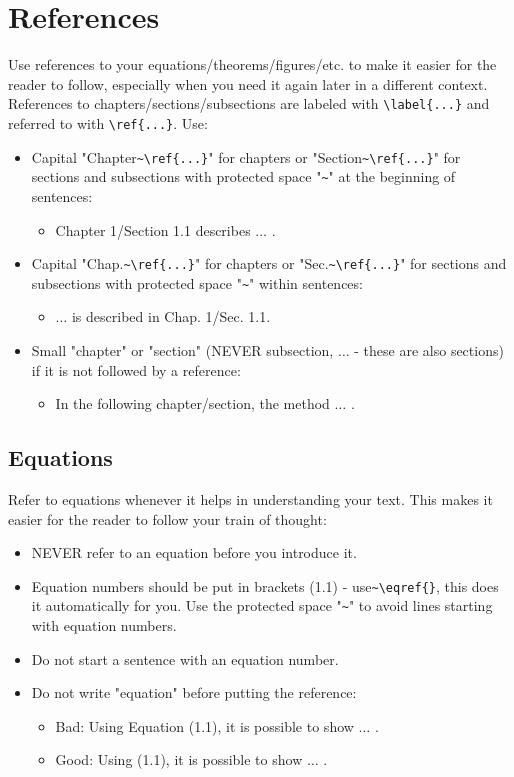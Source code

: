 \section{References}

Use references to your equations/theorems/figures/etc. to make it easier for the reader to follow, especially when you need it again later in a different context.
References to chapters/sections/subsections are labeled with \verb|\label{...}| and referred to with \verb|\ref{...}|. Use: 

\begin{itemize}
	\item Capital "Chapter\verb|~\ref{...}|" for chapters or "Section\verb|~\ref{...}|" for sections and subsections with protected space "\verb|~|" at the beginning of sentences:
	\begin{itemize}
		\item Chapter 1/Section 1.1 describes $\ldots$ .
	\end{itemize}
	\item Capital "Chap.\verb|~\ref{...}|" for chapters or "Sec.\verb|~\ref{...}|" for sections and subsections with protected space "\verb|~|" within sentences:
	\begin{itemize}
		\item $\ldots$ is described in Chap. 1/Sec. 1.1.
	\end{itemize}
	\item Small "chapter" or "section" (NEVER subsection, $\ldots$ - these are also sections) if it is not followed by a reference:
	\begin{itemize}
		\item In the following chapter/section, the method $\ldots$ .
	\end{itemize}
\end{itemize}

\subsection{Equations}
Refer to equations whenever it helps in understanding your text. This makes it easier for the reader to follow your train of thought:
\begin{itemize}
	\item NEVER refer to an equation before you introduce it. 
	\item Equation numbers should be put in brackets (1.1) - use\verb|~\eqref{}|, this does it automatically for you. Use the protected space "\verb|~|" to avoid lines starting with equation numbers.
	\item Do not start a sentence with an equation number.
	\item Do not write "equation" before putting the reference:
	\begin{itemize}
		\item Bad: Using Equation (1.1), it is possible to show $\ldots$ .
		\item Good: Using (1.1), it is possible to show $\ldots$ .
	\end{itemize}
\end{itemize}

